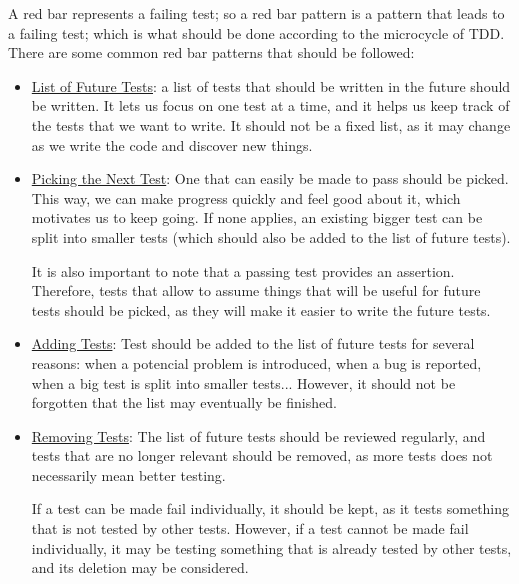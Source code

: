 A red bar represents a failing test; so a red bar pattern is a pattern that leads to a failing test; which is what should be done according to the microcycle of TDD. There are some common red bar patterns that should be followed:
\begin{itemize}
    \item \ul{List of Future Tests}: a list of tests that should be written in the future should be written. It lets us focus on one test at a time, and it helps us keep track of the tests that we want to write. It should not be a fixed list, as it may change as we write the code and discover new things.
    \item \ul{Picking the Next Test}: One that can easily be made to pass should be picked. This way, we can make progress quickly and feel good about it, which motivates us to keep going. If none applies, an existing bigger test can be split into smaller tests (which should also be added to the list of future tests).
    
    It is also important to note that a passing test provides an assertion. Therefore, tests that allow to assume things that will be useful for future tests should be picked, as they will make it easier to write the future tests.

    \item \ul{Adding Tests}: Test should be added to the list of future tests for several reasons: when a potencial problem is introduced, when a bug is reported, when a big test is split into smaller tests... However, it should not be forgotten that the list may eventually be finished.
    
    \item \ul{Removing Tests}: The list of future tests should be reviewed regularly, and tests that are no longer relevant should be removed, as more tests does not necessarily mean better testing.
    
    If a test can be made fail individually, it should be kept, as it tests something that is not tested by other tests. However, if a test cannot be made fail individually, it may be testing something that is already tested by other tests, and its deletion may be considered.
\end{itemize}


